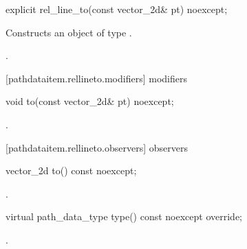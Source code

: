 \begin{itemdecl}
    explicit rel_line_to(const vector_2d& pt) noexcept;
\end{itemdecl}
\begin{itemdescr}
	\pnum
	\effects
	Constructs an object of type .
	
	\pnum
	\postconditions
	.
\end{itemdescr}

 [pathdataitem.rellineto.modifiers]{ modifiers}

\begin{itemdecl}
    void to(const vector_2d& pt) noexcept;
\end{itemdecl}
\begin{itemdescr}
	\pnum
	\postconditions
	.
\end{itemdescr}

 [pathdataitem.rellineto.observers]{ observers}

\begin{itemdecl}
    vector_2d to() const noexcept;
\end{itemdecl}
\begin{itemdescr}
	\pnum
	\returns
	.
\end{itemdescr}

\begin{itemdecl}
    virtual path_data_type type() const noexcept override;
\end{itemdecl}
\begin{itemdescr}
	\pnum
	\returns
	.
\end{itemdescr}
